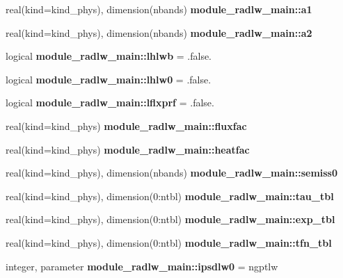 \begin{DoxyCompactItemize}
\item 
real(kind=kind\+\_\+phys), dimension(nbands) {\bfseries module\+\_\+radlw\+\_\+main\+::a1}
\item 
real(kind=kind\+\_\+phys), dimension(nbands) {\bfseries module\+\_\+radlw\+\_\+main\+::a2}
\item 
logical {\bfseries module\+\_\+radlw\+\_\+main\+::lhlwb} = .false.
\item 
logical {\bfseries module\+\_\+radlw\+\_\+main\+::lhlw0} = .false.
\item 
logical {\bfseries module\+\_\+radlw\+\_\+main\+::lflxprf} = .false.
\item 
real(kind=kind\+\_\+phys) {\bfseries module\+\_\+radlw\+\_\+main\+::fluxfac}
\item 
real(kind=kind\+\_\+phys) {\bfseries module\+\_\+radlw\+\_\+main\+::heatfac}
\item 
real(kind=kind\+\_\+phys), dimension(nbands) {\bfseries module\+\_\+radlw\+\_\+main\+::semiss0}
\item 
real(kind=kind\+\_\+phys), dimension(0\+:ntbl) {\bfseries module\+\_\+radlw\+\_\+main\+::tau\+\_\+tbl}
\item 
real(kind=kind\+\_\+phys), dimension(0\+:ntbl) {\bfseries module\+\_\+radlw\+\_\+main\+::exp\+\_\+tbl}
\item 
real(kind=kind\+\_\+phys), dimension(0\+:ntbl) {\bfseries module\+\_\+radlw\+\_\+main\+::tfn\+\_\+tbl}
\item 
integer, parameter {\bfseries module\+\_\+radlw\+\_\+main\+::ipsdlw0} = ngptlw
\end{DoxyCompactItemize}
